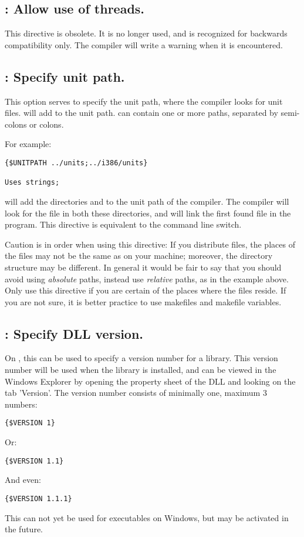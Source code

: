 \subsection{ : Allow use of threads.}

This directive is obsolete. It is no longer used, and is recognized for
backwards compatibility only.
The compiler will write a warning when it is encountered.

\subsection{ : Specify unit path.}

This option serves to specify the unit path, where the compiler looks for
unit files.  will add  to the unit
path.  can contain one or more paths, separated by semi-colons or
colons.

For example:
\begin{verbatim}
{$UNITPATH ../units;../i386/units}

Uses strings;
\end{verbatim}

will add the directories  and  to the unit
path of the compiler. The compiler will look for the file 
in both these directories, and will link the first found file in the
program. This directive is equivalent to the  command line switch.

Caution is in order when using this directive: If you distribute files, the
places of the files may not be the same as on your machine; moreover, the
directory structure may be different. In general it would be fair to say
that you should avoid using {\em absolute} paths, instead use {\em relative}
paths, as in the example above. Only use this directive if you are certain
of the places where the files reside. If you are not sure, it is better
practice to use makefiles and makefile variables.

\subsection{ : Specify DLL version.}
On \windows, this can be used to specify a version number for a library.
This version number will be used when the library is installed, and can be
viewed in the Windows Explorer by opening the property sheet of the DLL and
looking on the tab 'Version'. The version number consists of minimally one,
maximum 3 numbers:
\begin{verbatim}
{$VERSION 1}
\end{verbatim}
Or:
\begin{verbatim}
{$VERSION 1.1}
\end{verbatim}
And even:
\begin{verbatim}
{$VERSION 1.1.1}
\end{verbatim}
This can not yet be used for executables on Windows, but may be activated in
the future.

